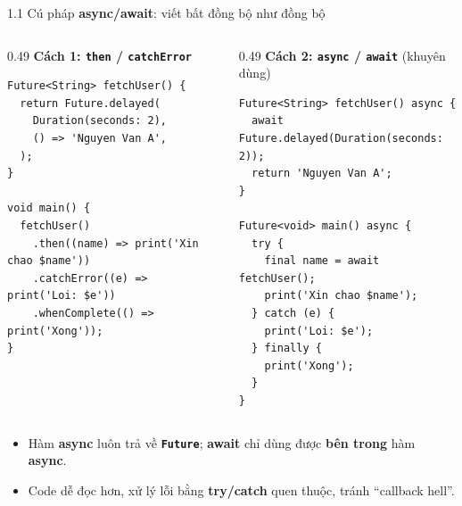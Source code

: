 \documentclass[aspectratio=169,10pt]{beamer}
\newcommand{\api}[1]{\texttt{\bfseries #1}}   %
\newcommand{\cd}[1]{\texttt{#1}}              %
\begin{document}
\begin{frame}[fragile]{1.1 Cú pháp \textbf{async/await}: viết bất đồng bộ như đồng bộ}
  \begin{columns}[T]
    \begin{column}{0.49\textwidth}
      \textbf{Cách 1: \cd{then} / \cd{catchError}}
\begin{lstlisting}
Future<String> fetchUser() {
  return Future.delayed(
    Duration(seconds: 2),
    () => 'Nguyen Van A',
  );
}

void main() {
  fetchUser()
    .then((name) => print('Xin chao $name'))
    .catchError((e) => print('Loi: $e'))
    .whenComplete(() => print('Xong'));
}
\end{lstlisting}
    \end{column}
    \begin{column}{0.49\textwidth}
      \textbf{Cách 2: \cd{async} / \cd{await}} (khuyên dùng)
\begin{lstlisting}
Future<String> fetchUser() async {
  await Future.delayed(Duration(seconds: 2));
  return 'Nguyen Van A';
}

Future<void> main() async {
  try {
    final name = await fetchUser();
    print('Xin chao $name');
  } catch (e) {
    print('Loi: $e');
  } finally {
    print('Xong');
  }
}
\end{lstlisting}
    \end{column}
  \end{columns}
  \vspace{4pt}
  \small
  \begin{itemize}\itemsep2pt
    \item Hàm \textbf{async} luôn trả về \api{Future}; \textbf{await} chỉ dùng được \textbf{bên trong} hàm \textbf{async}.
    \item Code dễ đọc hơn, xử lý lỗi bằng \textbf{try/catch} quen thuộc, tránh ``callback hell''.
  \end{itemize}
\end{frame}
\end{document}
